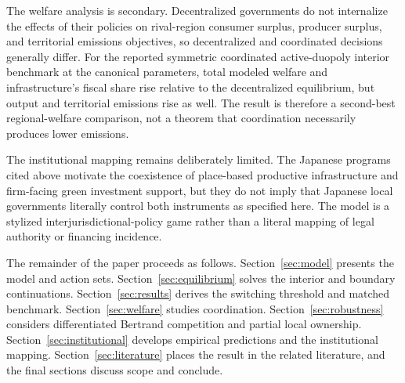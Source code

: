 The welfare analysis is secondary. Decentralized governments do not internalize the effects of their policies on rival-region consumer surplus, producer surplus, and territorial emissions objectives, so decentralized and coordinated decisions generally differ. For the reported symmetric coordinated active-duopoly interior benchmark at the canonical parameters, total modeled welfare and infrastructure's fiscal share rise relative to the decentralized equilibrium, but output and territorial emissions rise as well. The result is therefore a second-best regional-welfare comparison, not a theorem that coordination necessarily produces lower emissions.

The institutional mapping remains deliberately limited. The Japanese programs cited above motivate the coexistence of place-based productive infrastructure and firm-facing green investment support, but they do not imply that Japanese local governments literally control both instruments as specified here. The model is a stylized interjurisdictional-policy game rather than a literal mapping of legal authority or financing incidence.

The remainder of the paper proceeds as follows. Section~\ref{sec:model} presents the model and action sets. Section~\ref{sec:equilibrium} solves the interior and boundary continuations. Section~\ref{sec:results} derives the switching threshold and matched benchmark. Section~\ref{sec:welfare} studies coordination. Section~\ref{sec:robustness} considers differentiated Bertrand competition and partial local ownership. Section~\ref{sec:institutional} develops empirical predictions and the institutional mapping. Section~\ref{sec:literature} places the result in the related literature, and the final sections discuss scope and conclude.
